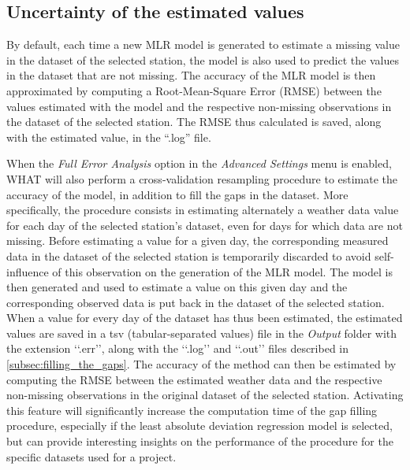 \documentclass[WHATMANUAL.tex]{subfiles}
\begin{document}
\subsection{Uncertainty of the estimated values}\label{subsec:uncertainty}

By default, each time a new MLR model is generated to estimate a missing value in the dataset of the selected station, the model is also used to predict the values in the dataset that are not missing. The accuracy of the MLR model is then approximated by computing a Root-Mean-Square Error (RMSE) between the values estimated with the model and the respective non-missing observations in the dataset of the selected station. The RMSE thus calculated is saved, along with the estimated value, in the ``.log'' file.

When the \emph{Full Error Analysis} option in the \emph{Advanced Settings} menu is enabled, WHAT will also perform a cross-validation resampling procedure to estimate the accuracy of the model, in addition to fill the gaps in the dataset. More specifically, the procedure consists in estimating alternately a weather data value for each day of the selected station's dataset, even for days for which data are not missing. Before estimating a value for a given day, the corresponding measured data in the dataset of the selected station is temporarily discarded to avoid self-influence of this observation on the generation of the MLR model. The model is then generated and used to estimate a value on this given day and the corresponding observed data is put back in the dataset of the selected station. When a value for every day of the dataset has thus been estimated, the estimated values are saved in a tsv (tabular-separated values) file in the \emph{Output} folder with the extension ‘‘.err’’, along with the ‘‘.log’’ and ‘‘.out’’ files described in \cref{subsec:filling_the_gaps}. The accuracy of the method can then be estimated by computing the RMSE between the estimated weather data and the respective non-missing observations in the original dataset of the selected station. Activating this feature will significantly increase the computation time of the gap filling procedure, especially if the least absolute deviation regression model is selected, but can provide interesting insights on the performance of the procedure for the specific datasets used for a project.
\end{document}
